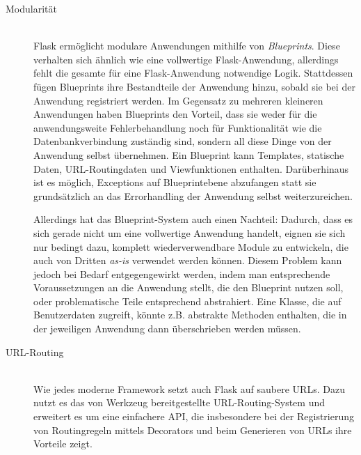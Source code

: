\begin{description}
\item[Modularität] \hfill \\
Flask ermöglicht modulare Anwendungen mithilfe von \emph{Blueprints}. Diese verhalten sich ähnlich
wie eine vollwertige Flask-Anwendung, allerdings fehlt die gesamte für eine Flask-Anwendung
notwendige Logik. Stattdessen fügen Blueprints ihre Bestandteile der Anwendung hinzu, sobald sie bei
der Anwendung registriert werden. Im Gegensatz zu mehreren kleineren Anwendungen haben
Blueprints den Vorteil, dass sie weder für die anwendungsweite Fehlerbehandlung noch für
Funktionalität wie die Datenbankverbindung zuständig sind, sondern all diese Dinge von der Anwendung
selbst übernehmen.
Ein Blueprint kann Templates, statische Daten, URL-Routingdaten und Viewfunktionen enthalten.
Darüberhinaus ist es möglich, Exceptions auf Blueprintebene abzufangen statt sie grundsätzlich an
das Errorhandling der Anwendung selbst weiterzureichen.

Allerdings hat das Blueprint-System auch einen Nachteil: Dadurch, dass es sich gerade nicht um eine
vollwertige Anwendung handelt, eignen sie sich nur bedingt dazu, komplett wiederverwendbare Module
zu entwickeln, die auch von Dritten \emph{as-is} verwendet werden können. Diesem Problem kann jedoch
bei Bedarf entgegengewirkt werden, indem man entsprechende Voraussetzungen an die Anwendung stellt,
die den Blueprint nutzen soll, oder problematische Teile entsprechend abstrahiert. Eine Klasse, die
auf Benutzerdaten zugreift, könnte z.B. abstrakte Methoden enthalten, die in der jeweiligen
Anwendung dann überschrieben werden müssen.


\item[URL-Routing] \hfill \\
Wie jedes moderne Framework setzt auch Flask auf saubere URLs. Dazu nutzt es das von Werkzeug
bereitgestellte URL-Routing-System und erweitert es um eine einfachere API, die insbesondere bei der
Registrierung von Routingregeln mittels Decorators und beim Generieren von URLs ihre Vorteile zeigt.


\end{description}
